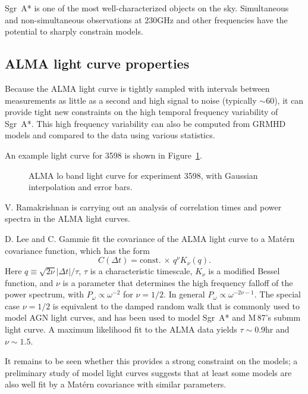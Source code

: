 \documentclass[twocolumn,tighten,dvipsnames]{aastex63}
\newcommand\sgra{Sgr~A*\xspace}
\def\M87{M\,87\xspace}
\newcommand\<{{\langle}}
\renewcommand\>{{\rangle}} %
\begin{document}
\sgra is one of the most well-characterized objects on the sky. Simultaneous and non-simultaneous observations at $230$GHz and  other frequencies have the potential to sharply constrain models.

\subsection{ALMA light curve properties}
\label{sec:lcconst}

Because the ALMA light curve is tightly sampled with intervals  between measurements as little as a second and high signal to noise (typically $\sim 60$), it can provide tight new constraints on the high temporal frequency variability of \sgra.  This high frequency variability can also be computed from GRMHD models and compared to the data using various statistics.

An example light curve for 3598 is shown in Figure~\ref{fig:LC3598}.

\begin{figure}
    \centering
    \caption{ALMA lo band light curve for experiment 3598, with Gaussian interpolation and error bars.}
    \label{fig:LC3598}
\end{figure}

V. Ramakrishnan is carrying out an analysis of correlation times and power spectra in the ALMA light curves.

D. Lee and C. Gammie fit the covariance of the ALMA light curve to a Mat\'ern covariance function, which has the form
\begin{equation}
    C(\Delta t) = \mbox{const.} \, \times \, q^\nu K_\nu(q).
\end{equation}
Here $q \equiv \sqrt{2\nu} |\Delta t|/\tau$, $\tau$ is a characteristic timescale, $K_\nu$ is a modified Bessel function, and $\nu$ is a parameter that determines the high frequency falloff of the power spectrum, with $P_\omega \propto \omega^{-2}$ for $\nu = 1/2$.  In general $P_\omega \propto \omega^{-2\nu - 1}$. The special case $\nu = 1/2$ is equivalent to the damped random walk that is commonly used to model AGN light curves, and has been used to model \sgra and \M87's submm light curve. A maximum likelihood fit to the ALMA data yields $\tau \sim 0.9$hr and $\nu \sim 1.5$.

It remains to be seen whether this provides a strong constraint on the models; a preliminary study of model light curves suggests that at least some models are also well fit by a Mat\'ern covariance with similar parameters.
\end{document}
